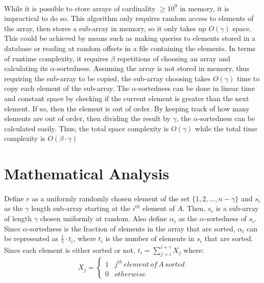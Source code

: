 \documentclass{article}
\begin{document}
\paragraph{}While it is possible to store arrays of cardinality $\geq 10^{9}$ in memory, it is impractical to do so. This algorithm only requires random access to elements of the array, then stores a sub-array in memory, so it only takes up $O(\gamma)$ space.
This could be achieved by means such as making queries to elements stored in a database or reading at random offsets in a file containing the elements.
In terms of runtime complexity, it requires $\beta$ repetitions of choosing an array and calculating its $\alpha$-sortedness. Assuming the array is not stored in memory, thus requiring the sub-array to be copied, the sub-array choosing takes $O(\gamma)$ time to copy each element of the sub-array.
The $\alpha$-sortedness can be done in linear time and constant space by checking if the current element is greater than the next element. If so, then the element is out of order. By keeping track of how many elements are out of order, then dividing the result by $\gamma$, the $\alpha$-sortedness can be calculated easily.
Thus, the total space complexity is $O(\gamma)$ while the total time complexity is $O(\beta \cdot \gamma)$
\section{Mathematical Analysis}
\paragraph{}Define $r$ as a uniformly randomly chosen element of the set $\{1, 2, ..., n - \gamma\}$ and $s_{i}$ as the $\gamma$ length sub-array starting at the $i^{th}$ element of $A$. Then, $s_{r}$ is a sub-array of length $\gamma$ chosen uniformly at random. Also define $\alpha_{i}$ as the $\alpha$-sortedness of $s_{i}$.
Since $\alpha$-sortedness is the fraction of elements in the array that are sorted, $\alpha_{i}$ can be represented as $\frac{1}{\gamma} \cdot t_{i}$, where $t_{i}$ is the number of elements in $s_{i}$ that are sorted. Since each element is either sorted or not, $t_{i} = \sum_{j=i}^{i+\gamma}X_{j}$ where:
\[ 
X_{j} =
\begin{cases}
	1 & j^{th}\, element\, of\, A\, sorted \\
	0 & otherwise
\end{cases} \]
\end{document}
